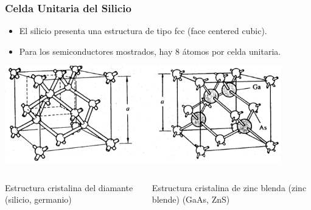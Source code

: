 \documentclass[10pt,t,aspectratio=169]{beamer}
\begin{document}
\begin{frame}
  \frametitle{Celda Unitaria del Silicio}

  \begin{itemize}
    \item El silicio presenta una estructura de tipo fcc (face centered cubic).
    \item Para los semiconductores mostrados, hay 8 átomos por celda unitaria.
  \end{itemize}
  
  \centering
  \vspace{3mm}
  \includegraphics[width=12cm]{./figures/unitcell-silicon.png}

  \vspace{3mm}
  \begin{columns}
    \begin{column}[]{0.4\textwidth}
      \centering
      Estructura cristalina del diamante (silicio, germanio)
    \end{column}
    \begin{column}[]{0.4\textwidth}
      \centering
      Estructura cristalina de zinc blenda (zinc blende) (GaAs, ZnS)
    \end{column}
  \end{columns}

\end{frame}
\end{document}
